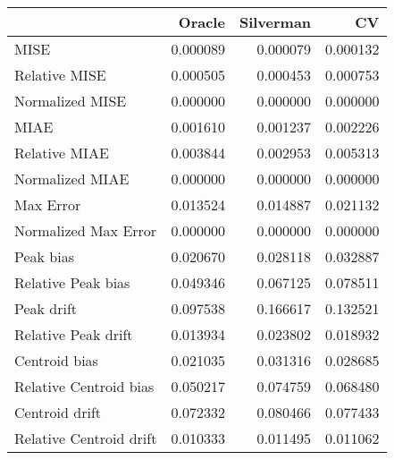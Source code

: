 \begin{tabular}{lrrr}
  \hline
 & Oracle & Silverman & CV \\ 
  \hline
MISE & 0.000089 & 0.000079 & 0.000132 \\ 
  Relative MISE & 0.000505 & 0.000453 & 0.000753 \\ 
  Normalized MISE & 0.000000 & 0.000000 & 0.000000 \\ 
  MIAE & 0.001610 & 0.001237 & 0.002226 \\ 
  Relative MIAE & 0.003844 & 0.002953 & 0.005313 \\ 
  Normalized MIAE & 0.000000 & 0.000000 & 0.000000 \\ 
  Max Error & 0.013524 & 0.014887 & 0.021132 \\ 
  Normalized Max Error & 0.000000 & 0.000000 & 0.000000 \\ 
  Peak bias & 0.020670 & 0.028118 & 0.032887 \\ 
  Relative Peak bias & 0.049346 & 0.067125 & 0.078511 \\ 
  Peak drift & 0.097538 & 0.166617 & 0.132521 \\ 
  Relative Peak drift & 0.013934 & 0.023802 & 0.018932 \\ 
  Centroid bias & 0.021035 & 0.031316 & 0.028685 \\ 
  Relative Centroid bias & 0.050217 & 0.074759 & 0.068480 \\ 
  Centroid drift & 0.072332 & 0.080466 & 0.077433 \\ 
  Relative Centroid drift & 0.010333 & 0.011495 & 0.011062 \\ 
   \hline
\end{tabular}
